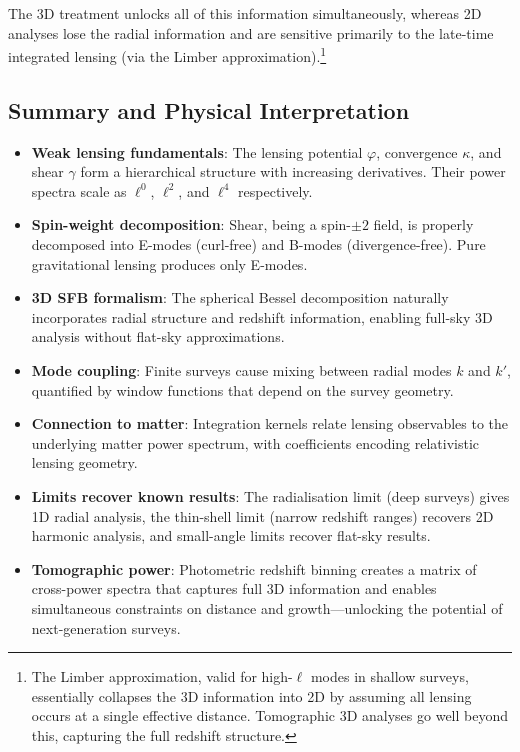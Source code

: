 The 3D treatment unlocks all of this information simultaneously, whereas 2D analyses lose the radial information and
are sensitive primarily to the late-time integrated lensing (via the Limber approximation).\footnote{The Limber approximation,
valid for high-$\ell$ modes in shallow surveys, essentially collapses the 3D information into 2D by assuming all lensing
occurs at a single effective distance. Tomographic 3D analyses go well beyond this, capturing the full redshift structure.}

\subsection{Summary and Physical Interpretation}

\begin{itemize}

\item \textbf{Weak lensing fundamentals}: The lensing potential $\varphi$, convergence $\kappa$, and shear $\gamma$ form a
hierarchical structure with increasing derivatives. Their power spectra scale as $\ell^0$, $\ell^2$, and $\ell^4$ respectively.

\item \textbf{Spin-weight decomposition}: Shear, being a spin-$\pm 2$ field, is properly decomposed into E-modes (curl-free) and
B-modes (divergence-free). Pure gravitational lensing produces only E-modes.

\item \textbf{3D SFB formalism}: The spherical Bessel decomposition naturally incorporates radial structure and redshift
information, enabling full-sky 3D analysis without flat-sky approximations.

\item \textbf{Mode coupling}: Finite surveys cause mixing between radial modes $k$ and $k'$, quantified by window functions
that depend on the survey geometry.

\item \textbf{Connection to matter}: Integration kernels relate lensing observables to the underlying matter power spectrum,
with coefficients encoding relativistic lensing geometry.

\item \textbf{Limits recover known results}: The radialisation limit (deep surveys) gives 1D radial analysis, the thin-shell
limit (narrow redshift ranges) recovers 2D harmonic analysis, and small-angle limits recover flat-sky results.

\item \textbf{Tomographic power}: Photometric redshift binning creates a matrix of cross-power spectra that captures full 3D
information and enables simultaneous constraints on distance and growth—unlocking the potential of next-generation surveys.

\end{itemize}
